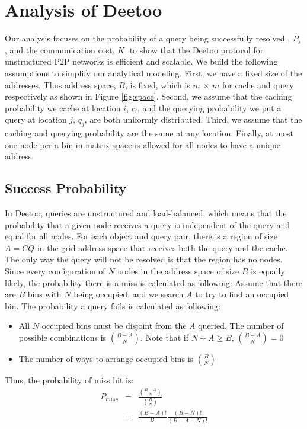 \documentclass[9.5pt,journal,final,finalsubmission,twocolumn]{IEEEtran}
\begin{document}
\section{Analysis of Deetoo}\label{sec:analysis}
Our analysis focuses on the probability of a query being successfully resolved
, $P_{s}$, and the communication cost, $K$, 
to show that the Deetoo protocol for unstructured P2P
networks is efficient and scalable. We build the following assumptions to 
simplify our analytical modeling.
First, we have a fixed size of the addresses. Thus
address space, $B$, is fixed, which is $m$ $\times$
$m$ for cache and query respectively as shown in
Figure \ref{fig:space}. Second, we assume that the caching probability we
cache at location $i$, $c_{i}$, and the querying
probability we put a query at location $j$, $q_{j}$, are both
uniformly distributed. Third, we assume that the caching and querying
probability are the same at any location. Finally, at most one node per
a bin in matrix space is allowed for all nodes to have a unique
address.


\subsection{Success Probability}
\label{sec:suc_prob}
In Deetoo, queries are unstructured and load-balanced, which means that
the probability that a given node receives a query is independent of
the query and equal for all nodes.
For each object and query pair, there is a region of size $A=CQ$ in
the grid address space that receives both the query and the cache.
The only way the query will not be resolved is that the region has no
nodes. Since every configuration of $N$ nodes in the address space of 
size $B$ is equally likely, the probability there is a miss is 
calculated as following:
Assume that there are $B$ bins with $N$ being occupied, and we search $A$
to try to find an occupied bin. The probability a query fails is 
calculated as following:
\begin{itemize}
\item All $N$ occupied bins must be disjoint from the $A$ queried. 
The number of possible combinations is ${{B-A}\choose{N}}$. Note that
if $N+A\geq B$, ${{B-A}\choose{N}}=0$
\item The number of ways to arrange occupied bins is ${{B}\choose{N}}$
\end{itemize}
Thus, the probability of miss hit is:
\begin{eqnarray}
P_{miss} &=& \frac{{{B-A}\choose{N}}}{{{B}\choose{N}}}\\
         &=& \frac{(B-A)!}{B!}\frac{(B-N)!}{(B-A-N)!}\label{eq:pmiss_exact}
\end{eqnarray}
\end{document}
